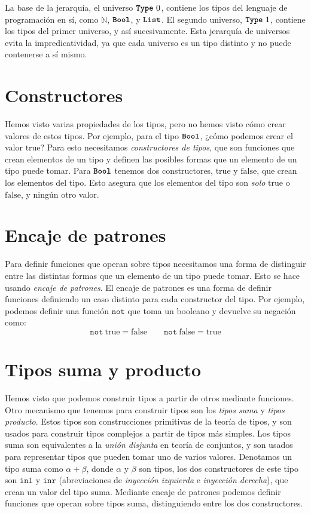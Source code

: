 \documentclass[
  a4paper, 
  10pt, 
  parskip=half, 
  toc=bibliography,
]{scrbook}
\theoremstyle{definition}
\theoremstyle{bolddef}
\newcommand{\funfont}[1]{\texttt{#1}}
\newcommand{\tyfont}[1]{\texttt{\textbf{#1}}}
\newcommand{\LeanTrue}{\text{true}}
\newcommand{\LeanFalse}{\text{false}}
\begin{document}
La base de la jerarquía, el universo \(\tyfont{Type} \ 0\), contiene los tipos del
lenguaje de programación en sí, como \(\mathbb{N}\), \(\tyfont{Bool}\), y
\(\tyfont{List}\). El segundo universo, \(\tyfont{Type} \ 1\), contiene los tipos
del primer universo, y así sucesivamente. Esta jerarquía de universos evita la
impredicatividad, ya que cada universo es un tipo distinto y no puede contenerse
a sí mismo.

\section{Constructores}

Hemos visto varias propiedades de los tipos, pero no hemos visto cómo crear
valores de estos tipos. Por ejemplo, para el tipo \(\tyfont{Bool}\), ¿cómo
podemos crear el valor \(\LeanTrue\)? Para esto necesitamos \emph{constructores de
tipos}, que son funciones que crean elementos de un tipo y definen las
posibles formas que un elemento de un tipo puede tomar. Para \(\tyfont{Bool}\) tenemos dos
constructores, \(\LeanTrue\) y \(\LeanFalse\), que crean los elementos del
tipo. Esto asegura que los elementos del tipo son \emph{solo} \(\LeanTrue\) o
\(\LeanFalse\), y ningún otro valor.

\section{Encaje de patrones}

Para definir funciones que operan sobre tipos necesitamos una forma de distinguir
entre las distintas formas que un elemento de un tipo puede tomar. Esto se
hace usando \emph{encaje de patrones}. El encaje de patrones es una forma de
definir funciones definiendo un caso distinto para cada constructor del tipo. Por
ejemplo, podemos definir una función \(\texttt{not}\) que toma un booleano y
devuelve su negación como:
\[
  \funfont{not} \ \LeanTrue = \LeanFalse \qquad
  \funfont{not} \ \LeanFalse = \LeanTrue
\]

\section{Tipos suma y producto}

Hemos visto que podemos construir tipos a partir de otros mediante funciones. 
Otro mecanismo que tenemos para construir tipos son los \emph{tipos suma} y
\emph{tipos producto}. Estos tipos son construcciones primitivas de la
teoría de tipos, y son usados para construir tipos complejos a partir de tipos
más simples. Los tipos suma son equivalentes a la \emph{unión disjunta} en teoría de
conjuntos, y son usados para representar tipos que pueden tomar uno de varios
valores. Denotamos un tipo suma como \(\alpha + \beta\), donde \(\alpha\) y \(\beta\) son
tipos, los dos constructores de este tipo son \(\funfont{inl}\) y
\(\funfont{inr}\) (abreviaciones de \emph{inyección izquierda} e
  \emph{inyección derecha}), que crean un valor del tipo suma. 
Mediante encaje de patrones podemos definir funciones que operan sobre tipos suma,
distinguiendo entre los dos constructores. 
\end{document}
